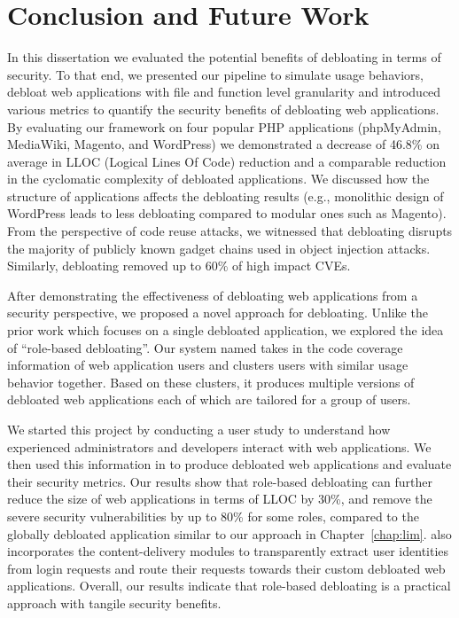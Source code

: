 \chapter{Conclusion and Future Work}
\label{chap:conclusion}

In this dissertation we evaluated the potential benefits of debloating in terms of security. 
To that end, we presented our pipeline to simulate usage behaviors, debloat web applications with file and function level granularity and introduced various metrics to quantify the security benefits of debloating web applications. 
By evaluating our framework on four popular PHP applications (phpMyAdmin, MediaWiki, Magento, and WordPress) we demonstrated a decrease of 46.8\% on average in LLOC (Logical Lines Of Code) reduction and a comparable reduction in the cyclomatic complexity of debloated applications. 
We discussed how the structure of applications affects the debloating results (e.g., monolithic design of WordPress leads to less debloating compared to modular ones such as Magento). 
From the perspective of code reuse attacks, we witnessed that debloating disrupts the majority of publicly known gadget chains used in object injection attacks. 
Similarly, debloating removed up to 60\% of high impact CVEs. 

After demonstrating the effectiveness of debloating web applications from a security perspective, we proposed a novel approach for debloating. 
Unlike the prior work which focuses on a single debloated application, we explored the idea of ``role-based debloating''. 
Our system named \sys{} takes in the code coverage information of web application users and clusters users with similar usage behavior together. 
Based on these clusters, it produces multiple versions of debloated web applications each of which are tailored for a group of users. 

We started this project by conducting a user study to understand how experienced administrators and developers interact with web applications. 
We then used this information in \sys{} to produce debloated web applications and evaluate their security metrics. 
Our results show that role-based debloating can further reduce the size of web applications in terms of LLOC by 30\%, and remove the severe security vulnerabilities by up to 80\% for some roles, compared to the globally debloated application similar to our approach in Chapter~\ref{chap:lim}. 
\sys{} also incorporates the content-delivery modules to transparently extract user identities from login requests and route their requests towards their custom debloated web applications. 
Overall, our results indicate that role-based debloating is a practical approach with tangile security benefits.

